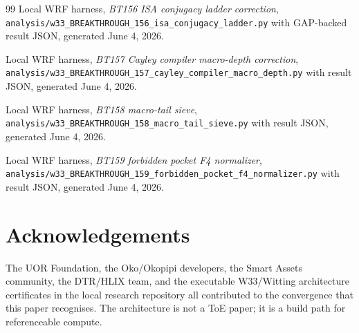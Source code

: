 \documentclass[11pt,letterpaper]{article}
\theoremstyle{remark}
\begin{document}
\begin{thebibliography}{99}
Local WRF harness, \emph{BT156 ISA conjugacy ladder correction},
\texttt{analysis/w33\_BREAKTHROUGH\_156\_isa\_conjugacy\_ladder.py}
with GAP-backed result JSON, generated June 4, 2026.

Local WRF harness, \emph{BT157 Cayley compiler macro-depth correction},
\texttt{analysis/w33\_BREAKTHROUGH\_157\_cayley\_compiler\_macro\_depth.py}
with result JSON, generated June 4, 2026.

Local WRF harness, \emph{BT158 macro-tail sieve},
\texttt{analysis/w33\_BREAKTHROUGH\_158\_macro\_tail\_sieve.py}
with result JSON, generated June 4, 2026.

Local WRF harness, \emph{BT159 forbidden pocket F4 normalizer},
\texttt{analysis/w33\_BREAKTHROUGH\_159\_forbidden\_pocket\_f4\_normalizer.py}
with result JSON, generated June 4, 2026.
\end{thebibliography}

\section*{Acknowledgements}
The UOR Foundation, the Oko/Okopipi developers, the Smart Assets community, the DTR/HLIX
team, and the executable W33/Witting architecture certificates in the local research
repository all contributed to the convergence that this paper recognises. The architecture
is not a ToE paper; it is a build path for referenceable compute.
\end{document}
